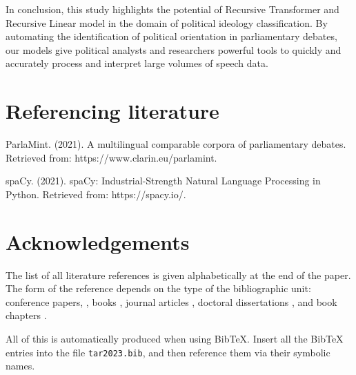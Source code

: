 \documentclass[10pt, a4paper]{article}
\begin{document}
In conclusion, this study highlights the potential of Recursive Transformer and Recursive Linear model in the domain of political ideology classification. 
By automating the identification of political orientation in parliamentary debates, our models give political analysts and researchers powerful tools to quickly and accurately process and interpret large volumes of speech data.

\section{Referencing literature}

ParlaMint. (2021). A multilingual comparable corpora of parliamentary debates. Retrieved from: https://www.clarin.eu/parlamint.

spaCy. (2021). spaCy: Industrial-Strength Natural Language Processing in Python. Retrieved from: https://spacy.io/.

\section*{Acknowledgements} 

The list of all literature references is given alphabetically at the end of the paper. The form of the reference depends on the type of the bibliographic unit: conference papers,
\citep{chave-64}, books \citep{butcher-81}, journal articles
\citep{howells-51}, doctoral dissertations \citep{croft-78}, and book chapters \citep{feigl-58}. 

All of this is automatically produced when using BibTeX. Insert all the BibTeX entries into the file \texttt{tar2023.bib}, and then reference them via their symbolic names.


 
\end{document}
